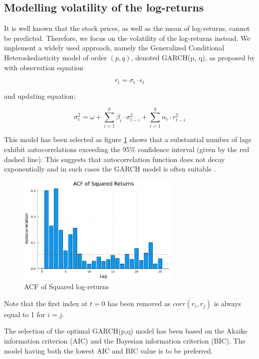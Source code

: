 \subsection{Modelling volatility of the log-returns}
It is well known that the stock prices, as well as the mean of log-returns, cannot be predicted. Therefore, we focus on the volatility of the log-returns instead. We implement a widely used approach, namely the Generalized Conditional Heteroskedasticity model of order \((p, q)\), denoted GARCH(p, q), as proposed by \citet{bollerslev1986} with observation equation

\begin{equation}
    r_t = \sigma_t \cdot \epsilon_t 
\end{equation}

and updating equation:

\begin{equation}
    \sigma^2_t = \omega + \sum_{i = 1}^{p} \beta_i \cdot \sigma^2_{t-i} + \sum_{i = 1}^{q} \alpha_i \cdot r^2_{t-i}
\end{equation}

This model has been selected as figure \ref{fig:acf_squared_returns} shows that a substantial number of lags exhibit autocorrelations exceeding the 95\% confidence interval (given by the red dashed line). This suggests that autocorrelation function does not decay exponentially and in such cases the GARCH model is often suitable \citep{tsay2010}.


\begin{figure}[H]
    \centering
    \includegraphics[width=0.7\textwidth]{figures/acf_squared_returns.pdf}
    \caption{ACF of Squared log-returns}
    \label{fig:acf_squared_returns}
\end{figure}
Note that the first index at \(t = 0\) has been removed as \(corr(r_i, r_j)\) is always equal to 1 for \(i = j\).


The selection of the optimal GARCH(p,q) model has been based on the Akaike information criterion (AIC) and the Bayesian information criterion (BIC). The model having both the lowest AIC and BIC value is to be preferred.

